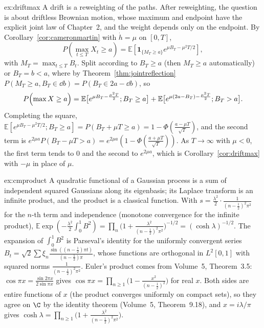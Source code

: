 \begin{solution}{ex:driftmax}
\idea A drift is a reweighting of the paths. After reweighting, the question is about driftless Brownian motion, whose maximum and endpoint have the explicit joint law of Chapter~2, and the weight depends
only on the endpoint.
\writeup By Corollary~\ref{cor:cameronmartin} with $\dot h=\mu$ on $[0,T]$,
\[
P(\max_{t\le T}X_t\ge a)=\mathbb E[\mathbf 1_{\{M_T\ge a\}}e^{\mu B_T-\mu^2T/2}],
\]
with $M_T=\max_{t\le T}B_t$. Split according to $B_T\ge a$ (then $M_T\ge a$
automatically) or $B_T=b<a$, where by Theorem~\ref{thm:jointreflection} $P(M_T\ge a,B_T\in\dd b)=P(B_T\in2a-\dd b)$, so
\[
P\Bigl(\max X\ge a\Bigr)=\mathbb E\bigl[e^{\mu B_T-\frac{\mu^2T}2};B_T\ge a\bigr]+\mathbb E\bigl[e^{\mu(2a-B_T)-\frac{\mu^2T}2};B_T>a\bigr].
\]
Completing the square, $\mathbb E[e^{\mu B_T-\mu^2T/2};B_T\ge a]=P(B_T+\mu T\ge a)=1-\Phi(\frac{a-\mu T}{\sqrt T})$, and the second term is $e^{2\mu a}P(B_T-\mu T>a)=e^{2\mu a}(1-\Phi(\frac{a+\mu T}{\sqrt T}))$. As
$T\to\infty$ with $\mu<0$, the first term tends to $0$ and the second to $e^{2\mu a}$, which is Corollary~\ref{cor:driftmax} with $-\mu$ in place of $\mu$.
\end{solution}

\begin{solution}{ex:cmproduct}
\idea A quadratic functional of a Gaussian process is a sum of independent squared Gaussians along its eigenbasis; its Laplace transform is an infinite product, and the product is a classical function.
\writeup With $s=\frac{\lambda^2}2\cdot\frac1{(n-\frac12)^2\pi^2}$ for the $n$-th term and independence (monotone convergence for the infinite product),
$\mathbb E\exp(-\frac{\lambda^2}2\int_0^1B^2)=\prod_n\bigl(1+\frac{\lambda^2}{(n-\frac12)^2\pi^2}\bigr)^{-1/2}=(\cosh\lambda)^{-1/2}$. The expansion of $\int_0^1B^2$ is Parseval's identity for the uniformly convergent series
$B_t=\sqrt2\sum\xi_n\frac{\sin((n-\frac12)\pi t)}{(n-\frac12)\pi}$, whose functions are orthogonal in $L^2[0,1]$ with squared norms $\frac1{(n-\frac12)^2\pi^2}$. Euler's product comes from Volume~5, Theorem~3.5: $\cos\pi x=\frac{\sin2\pi x}{2\sin\pi x}$ gives
$\cos\pi x=\prod_{n\ge1}\bigl(1-\frac{x^2}{(n-\frac12)^2}\bigr)$ for real $x$. Both sides are entire functions of $x$ (the product converges uniformly on compact sets), so they agree on $\C$ by the identity theorem
(Volume~5, Theorem~9.18), and $x=i\lambda/\pi$ gives $\cosh\lambda=\prod_{n\ge1}\bigl(1+\frac{\lambda^2}{(n-\frac12)^2\pi^2}\bigr)$.
\end{solution}

